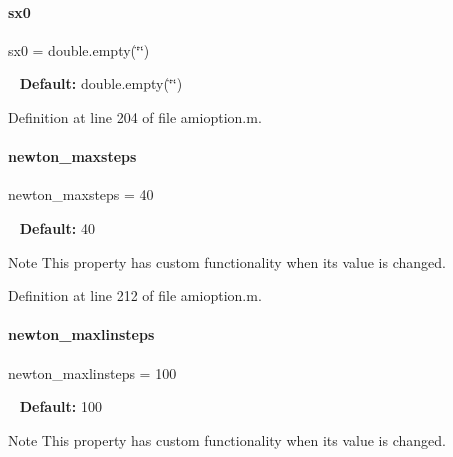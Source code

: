 \mbox{\label{classamioption_ae40f9a7172d3a41725c151afaec347f7}} 
\paragraph{\texorpdfstring{sx0}{sx0}}
{\footnotesize\ttfamily sx0 = double.\+empty(\char`\"{}\char`\"{})}

~\newline
{\bfseries{Default\+:}} double.\+empty(\char`\"{}\char`\"{}) 

Definition at line 204 of file amioption.\+m.

\mbox{\label{classamioption_a003c445698766726237b11dc6e5120fe}} 
\paragraph{\texorpdfstring{newton\_maxsteps}{newton\_maxsteps}}
{\footnotesize\ttfamily newton\+\_\+maxsteps = 40}

~\newline
{\bfseries{Default\+:}} 40

\begin{DoxyNote}{Note}
This property has custom functionality when its value is changed. 
\end{DoxyNote}


Definition at line 212 of file amioption.\+m.

\mbox{\label{classamioption_abea544569240b7cfcb1505d125a3b51b}} 
\paragraph{\texorpdfstring{newton\_maxlinsteps}{newton\_maxlinsteps}}
{\footnotesize\ttfamily newton\+\_\+maxlinsteps = 100}

~\newline
{\bfseries{Default\+:}} 100

\begin{DoxyNote}{Note}
This property has custom functionality when its value is changed. 
\end{DoxyNote}


